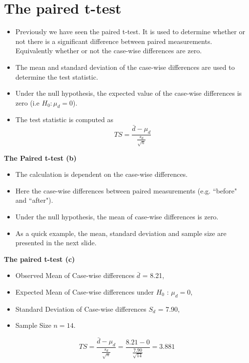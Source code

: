 \documentclass[]{report}
\begin{document}
		
		
\section{The paired t-test}
		
		\begin{itemize}
			\item  Previously we have seen the paired t-test. It is used to determine whether or
			not there is a significant difference between paired measurements. Equivalently whether or not
			the case-wise differences are zero.
			\item  The mean and standard deviation of the case-wise differences are used to determine the test statistic.
			\item  Under the null hypothesis, the expected value of the case-wise differences is zero (i.e $H_0 : \mu_d = 0$).
			\item  The test statistic is computed as
			\[ TS = \frac{\bar{d} - \mu_d}{\frac{s_d}{\sqrt{n}}} \]
		\end{itemize}
		
		
		
		
		\textbf{The Paired t-test (b)}
		\begin{itemize}
			\item  The calculation is dependent on the case-wise differences.
			\item  Here the case-wise differences between paired measurements (e.g. ``before" and ``after").
			\item  Under the null hypothesis, the mean of case-wise differences is zero.
			\item  As a quick example, the mean, standard deviation and sample size are presented in the next slide.
		\end{itemize}
		
		
		
		\textbf{The paired t-test (c)}
		\begin{itemize}
			\item  Observed Mean of Case-wise differences $\bar{d}$ = 8.21,
			\item  Expected Mean of Case-wise differences under $H_0$ : $\mu_d = 0$,
			\item  Standard Deviation of Case-wise differences $S_d$ = 7.90,
			\item  Sample Size $n=14$.
		\end{itemize}
		\[ TS = \frac{\bar{d} - \mu_d}{\frac{s_d}{\sqrt{n}}} = \frac{8.21 - 0}{\frac{7.90}{\sqrt{14}}} = 3.881 \]
\end{document}
